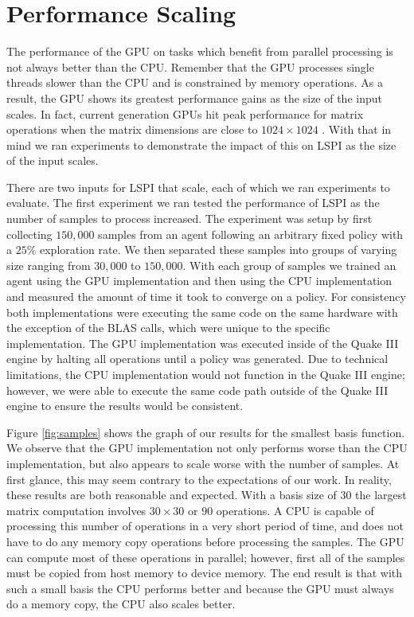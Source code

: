 \section{Performance Scaling}

The performance of the GPU on tasks which benefit from parallel processing is not always better than the CPU. Remember that the GPU processes single threads slower than the CPU and is constrained by memory operations. As a result, the GPU shows its greatest performance gains as the size of the input scales. In fact, current generation GPUs hit peak performance for matrix operations when the matrix dimensions are close to $1024 \times 1024$ \cite{cuda:perf}. With that in mind we ran experiments to demonstrate the impact of this on LSPI as the size of the input scales.

There are two inputs for LSPI that scale, each of which we ran experiments to evaluate. The first experiment we ran tested the performance of LSPI as the number of samples to process increased. The experiment was setup by first collecting $150,000$ samples from an agent following an arbitrary fixed policy with a $25\%$ exploration rate. We then separated these samples into groups of varying size ranging from $30,000$ to $150,000$. With each group of samples we trained an agent using the GPU implementation and then using the CPU implementation and measured the amount of time it took to converge on a policy. For consistency both implementations were executing the same code on the same hardware with the exception of the BLAS calls, which were unique to the specific implementation. The GPU implementation was executed inside of the Quake III engine by halting all operations until a policy was generated. Due to technical limitations, the CPU implementation would not function in the Quake III engine; however, we were able to execute the same code path outside of the Quake III engine to ensure the results would be consistent.

Figure \ref{fig:samples} shows the graph of our results for the smallest basis function. We observe that the GPU implementation not only performs worse than the CPU implementation, but also appears to scale worse with the number of samples. At first glance, this may seem contrary to the expectations of our work. In reality, these results are both reasonable and expected. With a basis size of $30$ the largest matrix computation involves $30 \times 30$ or $90$ operations. A CPU is capable of processing this number of operations in a very short period of time, and does not have to do any memory copy operations before processing the samples. The GPU can compute most of these operations in parallel; however, first all of the samples must be copied from host memory to device memory. The end result is that with such a small basis the CPU performs better and because the GPU must always do a memory copy, the CPU also scales better.

